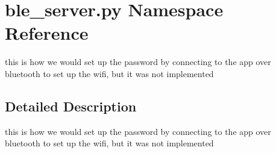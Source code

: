 \hypertarget{namespaceble__server_1_1py}{}\section{ble\+\_\+server.\+py Namespace Reference}
\label{namespaceble__server_1_1py}


this is how we would set up the password by connecting to the app over bluetooth to set up the wifi, but it was not implemented  




\subsection{Detailed Description}
this is how we would set up the password by connecting to the app over bluetooth to set up the wifi, but it was not implemented 
